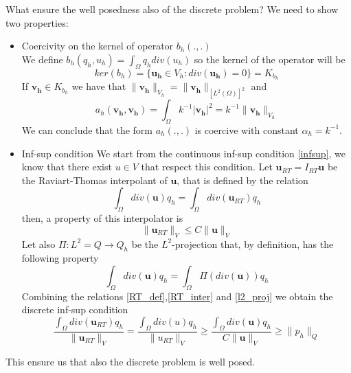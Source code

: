 \documentclass[]{report}
\begin{document}
What ensure the well posedness also of the discrete problem? We need to show two properties:
\begin{itemize}
	\item Coercivity on the kernel of operator $b_h(.,.)$\\
	We define $b_h(q_h,u_h)=\int_\Omega q_h div(u_h)$ so the kernel of the operator will be
	\begin{equation*}
		ker(b_h)=\{\mathbf{u_h}\in V_h:div(\mathbf{u_h})=0 \}=K_{b_h}
	\end{equation*}
	If $\mathbf{v_h}\in K_{b_h}$ we have that $\|\mathbf{v_h}\|_{V_h}=\|\mathbf{v_h}\|_{[L^2(\Omega)]^2}$ and
	\begin{equation}
		a_h(\mathbf{v_h},\mathbf{v_h})=\int_\Omega k^{-1}|\mathbf{v_h}|^2=k^{-1}\|\mathbf{v_h}\|_{V_h}
	\end{equation}
	We can conclude that the form $a_h(.,.)$ is coercive with constant $\alpha_h=k^{-1}$.
	\item Inf-sup condition
	We start from the continuous inf-sup condition \eqref{infsup}, we know that there exist $u \in V$ that respect this condition. Let $\mathbf{u}_{RT}=I_{RT}\mathbf{u}$ be the Raviart-Thomas interpolant of $\mathbf{u}$, that is defined by the relation
	\begin{equation}
		\int_\Omega div(\mathbf{u})q_h=\int_\Omega div(\mathbf{u}_{RT})q_h
		\label{RT_def}
	\end{equation} 
	then, a property of this interpolator is
	\begin{equation}
		\| \mathbf{u}_{RT} \|_V \leq C \|\mathbf{u}\|_V
		\label{RT_inter}
	\end{equation}
	Let also $\Pi:L^2=Q \rightarrow Q_h$ be the $L^2$-projection that, by definition, has the following property
	\begin{equation}
		\int_\Omega div(\mathbf{u})q_h=\int_\Omega \Pi(div(\mathbf{u}))q_h
		\label{l2_proj}
	\end{equation}
	Combining the relations \eqref{RT_def},\eqref{RT_inter} and \eqref{l2_proj} we obtain the discrete inf-sup condition
	\begin{equation}
		\frac{\int_\Omega div(\mathbf{u}_{RT})q_h}{\|\mathbf{u}_{RT}\|_V}=\frac{\int_\Omega div(u)q_h}{\|u_{RT}\|_V}\geq \frac{\int_\Omega div(\mathbf{u})q_h}{C\|\mathbf{u}\|_V}\geq \|p_h\|_Q
		\label{Dinf_sup}
	\end{equation}
	
\end{itemize}
This ensure us that also the discrete problem is well posed.
\end{document}
